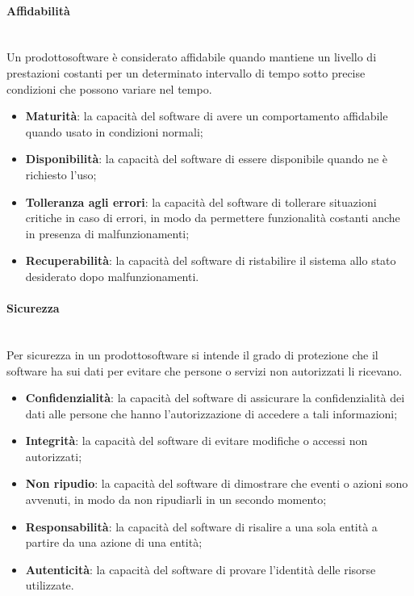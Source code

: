 	\paragraph{Affidabilità} \mbox{}\\
	Un prodotto\glosp software è considerato affidabile quando mantiene un livello di prestazioni costanti per un determinato intervallo di tempo sotto precise condizioni che possono variare nel tempo.
	\begin{itemize} \mbox{}\\
		\item \textbf{Maturità}: la capacità del software di avere un comportamento affidabile quando usato in condizioni normali;
		\item \textbf{Disponibilità}: la capacità del software di essere disponibile quando ne è richiesto l'uso;
		\item \textbf{Tolleranza agli errori}: la capacità del software di tollerare situazioni critiche in caso di errori, in modo da permettere funzionalità costanti anche in presenza di malfunzionamenti;
		\item \textbf{Recuperabilità}: la capacità del software di ristabilire il sistema allo stato desiderato dopo malfunzionamenti.
	\end{itemize}
	\paragraph{Sicurezza} \mbox{}\\
	Per sicurezza in un prodotto\glosp software si intende il grado di protezione che il software ha sui dati per evitare che persone o servizi non autorizzati li ricevano.
	\begin{itemize}
		\item \textbf{Confidenzialità}: la capacità del software di assicurare la confidenzialità dei dati alle persone che hanno l'autorizzazione di accedere a tali informazioni;
		\item \textbf{Integrità}: la capacità del software di evitare modifiche o accessi non autorizzati;
		\item \textbf{Non ripudio}: la capacità del software di dimostrare che eventi o azioni sono avvenuti, in modo da non ripudiarli in un secondo momento;
		\item \textbf{Responsabilità}: la capacità del software di risalire a una sola entità a partire da una azione di una entità;
		\item \textbf{Autenticità}: la capacità del software di provare l'identità delle risorse utilizzate.
	\end{itemize}
